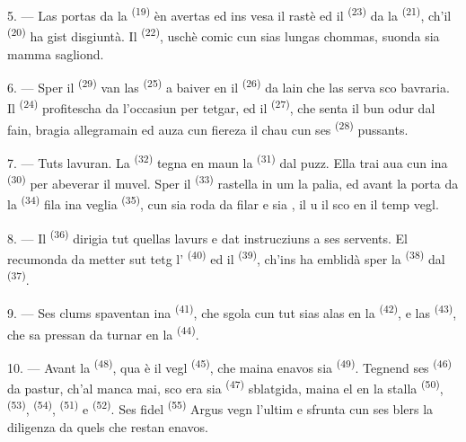 5. --- Las portas da la  \textsuperscript{(19)} èn avertas
ed ins vesa il rastè ed il  \textsuperscript{(23)} da la
 \textsuperscript{(21)}, ch'il 
\textsuperscript{(20)} ha gist disgiuntà. Il  \textsuperscript{(22)},
uschè comic cun sias lungas chommas, suonda sia mamma sagliond.

6. --- Sper il  \textsuperscript{(29)} van las 
\textsuperscript{(25)} a baiver en il  \textsuperscript{(26)} da lain che
las serva sco bavraria. Il  \textsuperscript{(24)} profitescha da
l'occasiun per tetgar, ed il  \textsuperscript{(27)}, che senta il bun odur
dal fain, bragia allegramain ed auza cun fiereza il chau cun ses 
\textsuperscript{(28)} pussants.

7. --- Tuts lavuran. La  \textsuperscript{(32)} tegna en maun la
 \textsuperscript{(31)} dal puzz. Ella trai aua cun ina 
\textsuperscript{(30)} per abeverar il muvel. Sper il 
\textsuperscript{(33)} rastella in um la palia, ed avant la porta da la
 \textsuperscript{(34)} fila ina veglia 
\textsuperscript{(35)}, cun sia roda da filar e sia , il
 u il  sco en il temp vegl.

\VUsaut{3.0mm}
\VUsaut{3.0mm}

8. --- Il  \textsuperscript{(36)} dirigia tut quellas lavurs e dat
instrucziuns a ses servents. El recumonda da metter sut tetg l'
\textsuperscript{(40)} ed il  \textsuperscript{(39)}, ch'ins ha emblidà
sper la  \textsuperscript{(38)} dal 
\textsuperscript{(37)}.

9. --- Ses clums spaventan ina  \textsuperscript{(41)}, che sgola cun
tut sias alas en la  \textsuperscript{(42)}, e las 
\textsuperscript{(43)}, che sa pressan da turnar en la 
\textsuperscript{(44)}.

10. --- Avant la  \textsuperscript{(48)}, qua è il vegl
 \textsuperscript{(45)}, che maina enavos sia 
\textsuperscript{(49)}. Tegnend ses  \textsuperscript{(46)} da pastur,
ch'al manca mai, sco era sia  \textsuperscript{(47)} sblatgida, maina el
en la stalla  \textsuperscript{(50)}, 
\textsuperscript{(53)},  \textsuperscript{(54)}, 
\textsuperscript{(51)} e  \textsuperscript{(52)}. Ses fidel
 \textsuperscript{(55)} Argus vegn l'ultim e sfrunta cun ses blers la
diligenza da quels che restan enavos.

